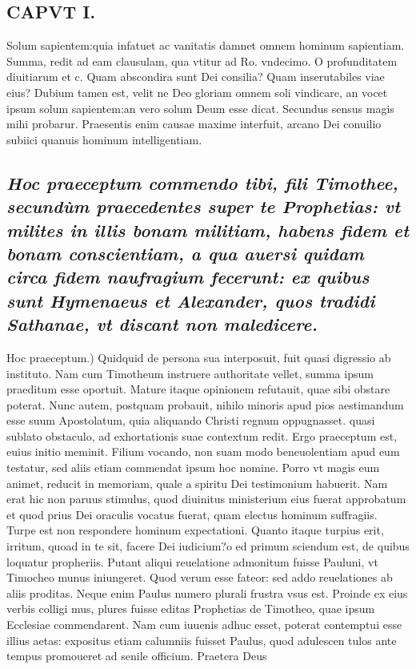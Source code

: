 \documentclass{article}
\begin{document}
\begin{pages}
\section*{CAPVT I. }
\marginpar{[ p.13 ]}\pstart Solum sapientem:quia infatuet ac vanitatis damnet omnem hominum sapientiam. Summa, redit ad eam clausulam, qua vtitur ad Ro. vndecimo. O profunditatem diuitiarum et c. Quam abscondira sunt Dei consilia? Quam inserutabiles viae eius? Dubium tamen est, velit ne Deo gloriam omnem soli vindicare, an vocet ipsum solum sapientem:an vero solum Deum esse dicat. Secundus sensus magis mihi probarur. Praesentis enim causae maxime interfuit, arcano Dei conuilio subiici quanuis hominum intelligentiam.  \pend
{}
{}
\subsection*{\textit{Hoc praeceptum commendo tibi, fili Timothee, secundùm praecedentes super te Prophetias: vt milites in illis bonam militiam, habens fidem et bonam conscientiam, a qua auersi quidam circa fidem naufragium fecerunt: ex quibus sunt Hymenaeus et Alexander, quos tradidi Sathanae, vt discant non maledicere. }}\pstart Hoc praeceptum.) Quidquid de persona sua interposuit, fuit quasi digressio ab instituto. Nam cum Timotheum instruere authoritate vellet, summa ipsum praeditum esse oportuit. Mature itaque opinionem refutauit, quae sibi obstare poterat. Nunc autem, postquam probauit, nihilo minoris apud pios aestimandum esse suum Apostolatum, quia aliquando Christi regnum oppugnasset. quasi sublato obstaculo, ad exhortationis suae contextum redit. Ergo praeceptum est, euius initio meminit. Filium vocando, non suam modo beneuolentiam apud eum testatur, sed aliis etiam commendat ipsum hoc nomine. Porro vt magis eum animet, reducit in memoriam, quale a spiritu Dei testimonium habuerit. Nam erat hic non paruus stimulus, quod diuinitus ministerium eius fuerat approbatum et quod prius Dei oraculis vocatus fuerat, quam electus hominum suffragiis. Turpe est non respondere hominum expectationi. Quanto itaque turpius erit, irritum, quoad in te sit, facere Dei iudicium?o ed primum sciendum est, de quibus loquatur propheriis. Putant aliqui reuelatione admonitum fuisse Pauluni, vt Timocheo munus iniungeret. Quod verum esse fateor: sed addo reuelationes ab aliis proditas. Neque enim Paulus numero plurali frustra vsus est. Proinde ex eius verbis colligi mus, plures fuisse editas Prophetias de Timotheo, quae ipsum Ecclesiae commendarent. Nam cum iuuenis adhuc esset, poterat contemptui esse illius aetas: expositus etiam calumniis fuisset Paulus, quod adulescen tulos ante tempus promoueret ad senile officium. Praetera Deus  \pend

\end{pages}
\end{document}
